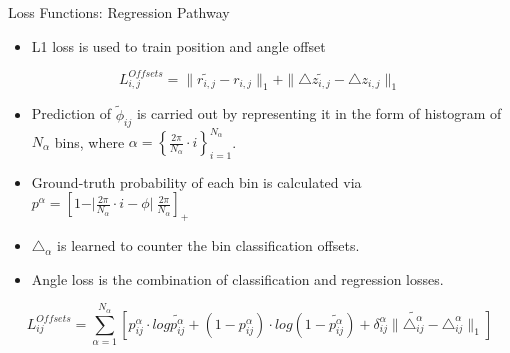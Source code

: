 \documentclass[aspectratio=169]{beamer}
\begin{document}
\begin{frame}{Loss Functions: Regression Pathway}
    \begin{itemize}
        \item L1 loss is used to train position and angle offset
    \end{itemize}
    
    \begin{equation}
                L^{Offsets}_{i,j} = \parallel \widetilde{r_{i,j}} - r_{i,j} \parallel_{1} + \parallel \triangle{\widetilde{z_{i,j}}} - \triangle{z_{i,j}} \parallel_{1} 
     \end{equation}

    \begin{itemize}
        \item Prediction of $\widetilde{\phi}_{ij}$ is carried out by representing it in the form of histogram of $N_{\alpha}$ bins, where $\alpha = \left\{\frac{2\pi}{N_{\alpha} } \cdot i \right\}^{N_{\alpha}}_{i =1} $.
        \item Ground-truth probability of each bin is calculated via $ p^{\alpha} = [1 - \vert \frac{2\pi}{N_{\alpha}} \cdot i  - \phi  \vert \ \frac{2\pi}{N_{\alpha}} ]_{+}$
        \item $\triangle_{\alpha}$ is learned to counter the bin classification offsets.
        \item Angle loss is the combination of classification and regression losses.
    \end{itemize}

    \begin{equation}
                 L_{ij}^{Offsets} = \sum_{\alpha=1}^{N_{\alpha}}[p^{\alpha}_{ij} \cdot log \tilde{p^{\alpha}_{ij}} + (1 - p^{\alpha}_{ij}) \cdot log(1 - \tilde{p^{\alpha}_{ij}}) + \delta^{\alpha}_{ij} \parallel   \tilde{\triangle^{\alpha}_{ij}} - \triangle^{\alpha}_{ij} \parallel_{1} ] 
             \end{equation}
    
\end{frame}
\end{document}
